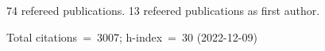 74 refereed publications. 13 refeered publications as first author.

Total citations~=~3007; h-index~=~30 (2022-12-09)